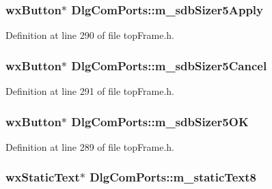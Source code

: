 \hypertarget{class_dlg_com_ports_a370f3c0a292163cfc65c09f85be962f7}{
\subsubsection[{m\-\_\-sdb\-Sizer5\-Apply}]{\setlength{\rightskip}{0pt plus 5cm}wx\-Button$\ast$ Dlg\-Com\-Ports\-::m\-\_\-sdb\-Sizer5\-Apply\hspace{0.3cm}{\ttfamily [protected]}}}\label{class_dlg_com_ports_a370f3c0a292163cfc65c09f85be962f7}


Definition at line 290 of file top\-Frame.\-h.

\hypertarget{class_dlg_com_ports_abad0ef2595c613184b545ecd91b994d9}{
\subsubsection[{m\-\_\-sdb\-Sizer5\-Cancel}]{\setlength{\rightskip}{0pt plus 5cm}wx\-Button$\ast$ Dlg\-Com\-Ports\-::m\-\_\-sdb\-Sizer5\-Cancel\hspace{0.3cm}{\ttfamily [protected]}}}\label{class_dlg_com_ports_abad0ef2595c613184b545ecd91b994d9}


Definition at line 291 of file top\-Frame.\-h.

\hypertarget{class_dlg_com_ports_a2ff33e71acd9d244306526c9e1c914f8}{
\subsubsection[{m\-\_\-sdb\-Sizer5\-O\-K}]{\setlength{\rightskip}{0pt plus 5cm}wx\-Button$\ast$ Dlg\-Com\-Ports\-::m\-\_\-sdb\-Sizer5\-O\-K\hspace{0.3cm}{\ttfamily [protected]}}}\label{class_dlg_com_ports_a2ff33e71acd9d244306526c9e1c914f8}


Definition at line 289 of file top\-Frame.\-h.

\hypertarget{class_dlg_com_ports_af0cbd9e67bbede8e5b1d4ef2941d4ad6}{
\subsubsection[{m\-\_\-static\-Text8}]{\setlength{\rightskip}{0pt plus 5cm}wx\-Static\-Text$\ast$ Dlg\-Com\-Ports\-::m\-\_\-static\-Text8\hspace{0.3cm}{\ttfamily [protected]}}}\label{class_dlg_com_ports_af0cbd9e67bbede8e5b1d4ef2941d4ad6}


